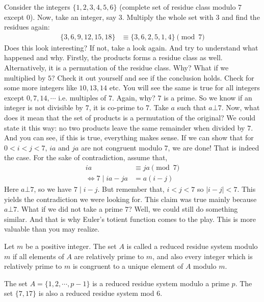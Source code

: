 \documentclass{subfile}
\begin{document}
	Consider the integers $\{1,2,3,4,5,6\}$ (complete set of residue class modulo $7$ except $0$). Now, take an integer, say $3$. Multiply the whole set with $3$ and find the residues again:
		\begin{align*}
			\{3,6,9,12,15,18\} & \equiv\{3,6,2,5,1,4\}\pmod7
		\end{align*}
	Does this look interesting? If not, take a look again. And try to understand what happened and why. Firstly, the products forms a residue class as well. Alternatively, it is a permutation of the residue class. Why? What if we multiplied by $5$? Check it out yourself and see if the conclusion holds. Check for some more integers like $10, 13,14$ etc. You will see the same is true for all integers except $0,7,14,\cdots$ i.e. multiples of $7$. Again, why? $7$ is a prime. So we know if an integer is not divisible by $7$, it is co-prime to $7$. Take $a$ such that $a\bot7$. Now, what does it mean that the set of products is a permutation of the original? We could state it this way: no two products leave the same remainder when divided by $7$. And you can see, if this is true, everything makes sense. If we can show that for $0<i<j<7$, $ia$ and $ja$ are not congruent modulo $7$, we are done! That is indeed the case. For the sake of contradiction, assume that,
		\begin{align*}
			ia
				& \equiv ja\pmod7\\
			\iff 7\mid ia-ja
				&=a(i-j)
		\end{align*}
	Here $a\bot7$, so we have $7\mid i-j$. But remember that, $i<j<7$ so $|i-j|<7$. This yields the contradiction we were looking for. This claim was true mainly because $a\bot7$. What if we did not take a prime $7$? Well, we could still do something similar. And that is why Euler's totient function comes to the play. This is more valuable than you may realize.

	\begin{definition}
		Let $m$ be a positive integer. The set $A$ is called a {reduced residue system modulo $m$} if all elements of $A$ are relatively prime to $m$, and also every integer which is relatively prime to $m$ is congruent to a unique element of $A$ modulo $m$.
	\end{definition}

	\begin{example}
		The set $A=\{ 1, 2, \cdots, p-1 \}$ is a reduced residue system modulo a prime $p$. The set $\{7, 17\}$ is also a reduced residue system mod $6$.
	\end{example}
\end{document}
